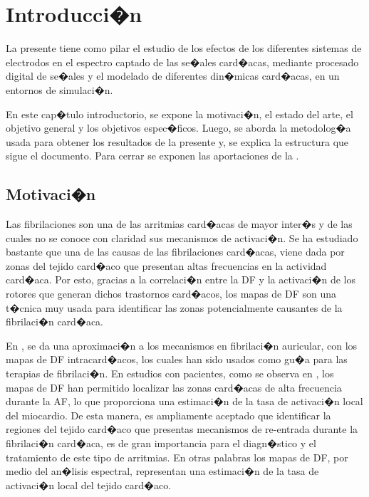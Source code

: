 
\chapter{Introducci�n}
\begin{resumen}
La presente \nombreDoc tiene como pilar el estudio de los efectos de los
diferentes sistemas de electrodos en el espectro captado de las se�ales card�acas,
mediante procesado digital de se�ales y el modelado de diferentes din�micas
card�acas, en un entornos de simulaci�n. 

En este cap�tulo introductorio, se expone la motivaci�n, el estado del arte, el 
objetivo general y los objetivos espec�ficos. Luego, se
aborda la metodolog�a usada para obtener los resultados de la
presente \nombreDoc y, se explica la estructura que sigue el
documento. Para cerrar se exponen las aportaciones de la \nombreDoc.



\end{resumen} 


\medskip %




\section{Motivaci�n}
Las fibrilaciones son una de las arritmias card�acas de mayor inter�s y de las
cuales no se conoce con claridad sus mecanismos de activaci�n. Se ha estudiado
bastante que una de las causas de las fibrilaciones card�acas, viene dada por
zonas del tejido card�aco que presentan altas frecuencias en la actividad
card�aca. Por esto, gracias a la correlaci�n entre la \ac{DF} y la activaci�n de
los rotores que generan dichos trastornos card�acos, los mapas de \ac{DF} son
una t�cnica muy usada para identificar las zonas potencialmente causantes de la
fibrilaci�n card�aca.

En \cite{Berenfeld10}, se da una  aproximaci�n a los mecanismos en fibrilaci�n
auricular, con los mapas de \ac{DF} intracard�acos, los cuales han sido usados
como gu�a para las terapias de fibrilaci�n. En estudios con pacientes,  como se
observa en \cite{Sanders05, atienza2009, atienza2011, kumagai2013, okumura2012},
los mapas de \ac{DF} han permitido localizar las zonas card�acas de alta
frecuencia durante la \ac{AF}, lo que proporciona una estimaci�n de la tasa de
activaci�n local del miocardio. De esta manera, es ampliamente aceptado que
identificar la regiones del tejido card�aco que presentas mecanismos de
re-entrada durante la fibrilaci�n card�aca, es de gran importancia para el
diagn�stico y el tratamiento de este tipo de arritmias. En otras palabras los
mapas de \ac{DF}, por medio del an�lisis espectral, representan una estimaci�n
de la tasa de activaci�n local del tejido card�aco.


